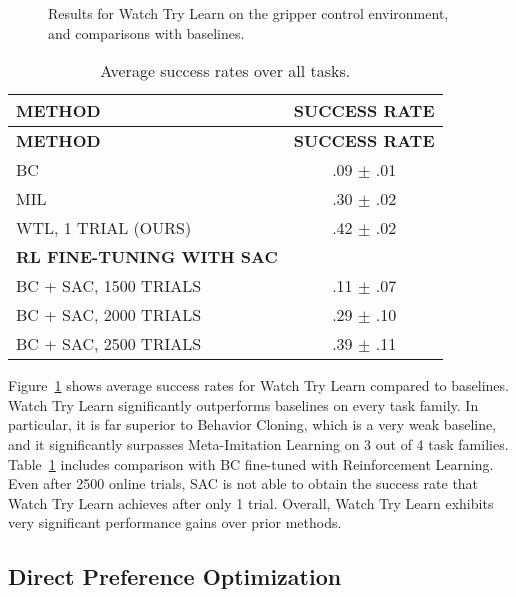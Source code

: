 \documentclass[
  letterpaper,
  numbers=noenddot,
  DIV=11]{scrreprt}
\theoremstyle{definition}
\theoremstyle{plain}
\theoremstyle{plain}
\theoremstyle{remark}
\begin{document}
\begin{figure}


\caption{\label{fig-watch-try-learn-results}Results for Watch Try Learn
on the gripper control environment, and comparisons with baselines.}

\end{figure}%

\begin{longtable}[]{@{}lc@{}}
\caption{Average success rates over all
tasks.}\label{tbl-watch-try-learn-table}\tabularnewline
\toprule\noalign{}
\textbf{METHOD} & \textbf{SUCCESS RATE} \\
\midrule\noalign{}
\endfirsthead
\toprule\noalign{}
\textbf{METHOD} & \textbf{SUCCESS RATE} \\
\midrule\noalign{}
\endhead
\bottomrule\noalign{}
\endlastfoot
BC & .09 \(\pm\) .01 \\
MIL & .30 \(\pm\) .02 \\
WTL, 1 TRIAL (OURS) & .42 \(\pm\) .02 \\
\textbf{RL FINE-TUNING WITH SAC} & \\
BC + SAC, 1500 TRIALS & .11 \(\pm\) .07 \\
BC + SAC, 2000 TRIALS & .29 \(\pm\) .10 \\
BC + SAC, 2500 TRIALS & .39 \(\pm\) .11 \\
\end{longtable}

Figure~\ref{fig-watch-try-learn-results} shows average success rates for
Watch Try Learn compared to baselines. Watch Try Learn significantly
outperforms baselines on every task family. In particular, it is far
superior to Behavior Cloning, which is a very weak baseline, and it
significantly surpasses Meta-Imitation Learning on 3 out of 4 task
families. Table~\ref{tbl-watch-try-learn-table} includes comparison with
BC fine-tuned with Reinforcement Learning. Even after 2500 online
trials, SAC is not able to obtain the success rate that Watch Try Learn
achieves after only 1 trial. Overall, Watch Try Learn exhibits very
significant performance gains over prior methods.

\subsection{Direct Preference
Optimization}\label{direct-preference-optimization}
\end{document}
